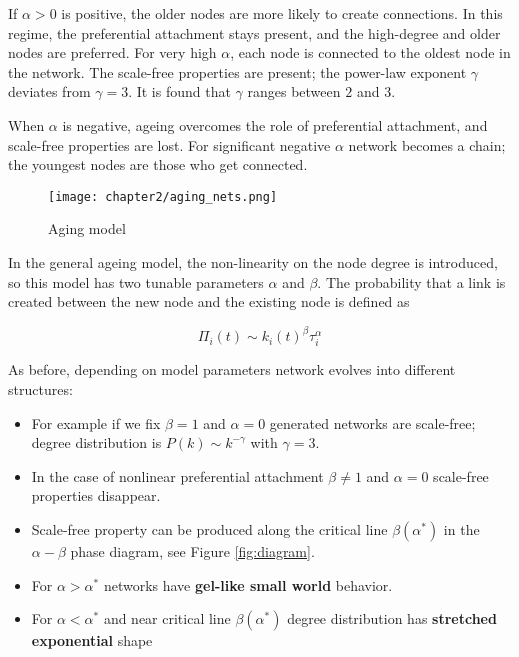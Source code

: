 If $\alpha>0$ is positive, the older nodes are more likely to create connections. In this regime, the preferential attachment stays present, and the high-degree and older nodes are preferred. For very high $\alpha$, each node is connected to the oldest node in the network. The scale-free properties are present; the power-law exponent $\gamma$ deviates from $\gamma=3$. It is found that $\gamma$ ranges between $2$ and $3$. 

When $\alpha$ is negative, ageing overcomes the role of preferential attachment, and scale-free properties are lost. For significant negative $\alpha$ network becomes a chain; the youngest nodes are those who get connected. 

\begin{figure}[h]
	\centering
	\texttt{[image: chapter2/aging\_nets.png]}
	\caption[Aging model]{Aging model}
	\label{fig:aging}
\end{figure}

In the general ageing model, the non-linearity on the node degree is introduced, so this model has two tunable parameters $\alpha $ and $\beta$. The probability that a link is created between the new node and the existing node is defined as \cite{hajra2004}

\begin{equation}
\Pi_{i}(t)\sim k_{i}(t)^{\beta}\tau_{i}^{\alpha} 
\label{eq:1}
\end{equation}

As before, depending on model parameters network evolves into different structures:  
\begin{itemize}
	\item For example if we fix $\beta=1$ and $\alpha=0$ generated networks are scale-free; degree distribution is $P(k) \sim k^{-\gamma}$ with $\gamma=3$.
	\item In the case of nonlinear preferential attachment $\beta \neq 1$ and $\alpha=0$ scale-free properties disappear. 
	\item Scale-free property can be produced along the critical line $\beta(\alpha^{*})$ in the $\alpha-\beta$ phase diagram, see Figure \ref{fig:diagram}.
	
	\item For $\alpha>\alpha^{*}$ networks have \textbf{gel-like small world} behavior.
	
	\item For $\alpha<\alpha^{*}$ and near critical line $\beta(\alpha^{*})$ degree distribution has \textbf{stretched exponential} shape
	
\end{itemize}

